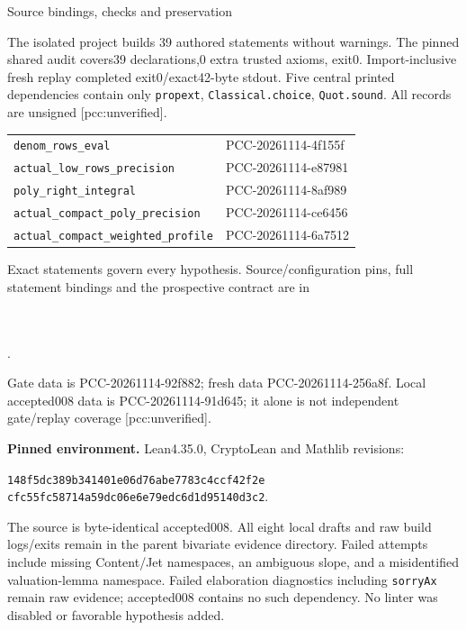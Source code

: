 \documentclass[10pt]{article}
\begin{document}
\newpage
\begin{center}{\Large Source bindings, checks and preservation}\end{center}
The isolated project builds 39 authored statements without warnings.
The pinned shared audit covers39 declarations,0 extra trusted axioms,
exit0. Import-inclusive fresh replay completed exit0/exact42-byte stdout. Five central
printed dependencies contain only \texttt{propext}, \texttt{Classical.choice},
\texttt{Quot.sound}. All records are unsigned [pcc:unverified].

\begin{center}\small
\begin{tabular}{p{.63\linewidth}p{.26\linewidth}}
\texttt{denom\_rows\_eval}&PCC-20261114-4f155f\\
\texttt{actual\_low\_rows\_precision}&PCC-20261114-e87981\\
\texttt{poly\_right\_integral}&PCC-20261114-8af989\\
\texttt{actual\_compact\_poly\_precision}&PCC-20261114-ce6456\\
\texttt{actual\_compact\_weighted\_profile}&PCC-20261114-6a7512
\end{tabular}
\end{center}
Exact statements govern every hypothesis. Source/configuration pins, full
statement bindings and the prospective contract are in
\begin{center}\small
{}\\
\\
.
\end{center}
Gate data is PCC-20261114-92f882; fresh data PCC-20261114-256a8f.
Local accepted008 data is
PCC-20261114-91d645; it alone is not independent
gate/replay coverage [pcc:unverified].

\textbf{Pinned environment.} Lean4.35.0, CryptoLean and Mathlib revisions:
\begin{center}\small
\texttt{148f5dc389b341401e06d76abe7783c4ccf42f2e}\\
\texttt{cfc55fc58714a59dc06e6e79edc6d1d95140d3c2}.
\end{center}
The source is byte-identical accepted008. All eight local drafts and raw
build logs/exits remain in the parent bivariate evidence directory.
Failed attempts include missing Content/Jet namespaces, an ambiguous slope,
and a misidentified valuation-lemma namespace. Failed elaboration diagnostics
including \texttt{sorryAx} remain raw evidence; accepted008 contains no such
dependency. No linter was disabled or favorable hypothesis added.
\end{document}
